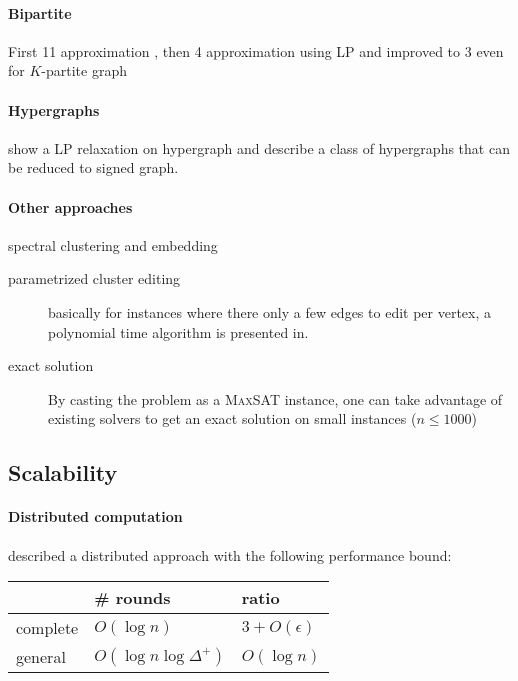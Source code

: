 \paragraph{Bipartite \pcc{}}
First 11 approximation \autocite{Amit04}, then 4 approximation using LP
\autocite{Bipartite12} and improved to 3 even for $K$-partite graph \autocite{Chawla2014}

\paragraph{Hypergraphs} \Textcite{Kim2011} show a LP relaxation on hypergraph
and \textcite{Ricatte13} describe a class of hypergraphs that can be reduced
to signed graph.

\paragraph{Other approaches}

\begin{description}
	\item[spectral clustering and embedding] \autocite{SignedEmbedding15}
	\item[parametrized cluster editing] basically for instances where there only
		a few edges to edit per vertex, a polynomial time algorithm is presented
		in\autocite{Abu-Khzam2015}.
	\item[exact solution] By casting the problem as a \textsc{MaxSAT}
		instance, one can take advantage of existing solvers to get an exact
		solution on small instances ($n \leq 1000$) \autocite{Berg2015}
\end{description}

\subsection{Scalability}
\paragraph{Distributed computation}
\Textcite{Chierichetti2014} described a distributed approach with the
following performance bound:

\begin{tabular}{lll}
	\toprule
	& \# rounds  & ratio \\
	\midrule
	complete & $O(\log n)$ & $3 + O(\epsilon)$ \\
	general & $O(\log n\log{\Delta^+})$ & $O(\log{n})$ \\
	\bottomrule
\end{tabular}


